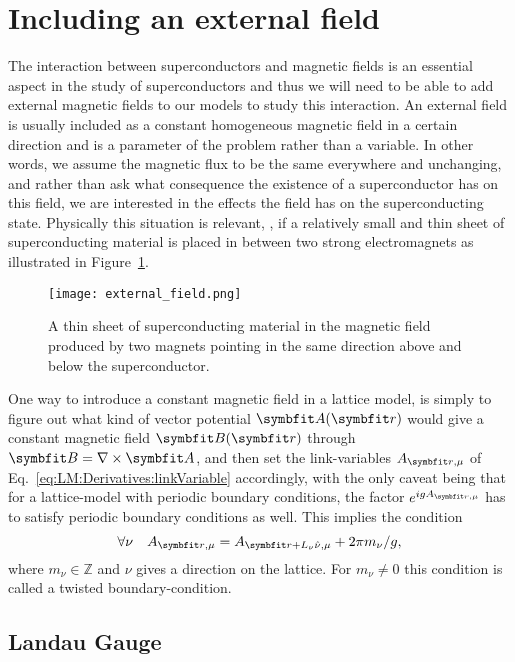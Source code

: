 \section{Including an external field}
\label{sec:LM:Field}

The interaction between superconductors and magnetic fields is an essential aspect in the study of superconductors and thus we will need to be able to add external magnetic fields
to our models to study this interaction. An external field is usually included as a constant homogeneous magnetic field in a certain direction and is a parameter of
the problem rather than a variable. In other words, we assume the magnetic flux to be the same everywhere and unchanging, and rather than ask what consequence the existence of a superconductor
has on this field, we are interested in the effects the field has on the superconducting state. Physically this situation is relevant, \eg, if a relatively small and thin sheet
of superconducting material is placed in between two strong electromagnets as illustrated in Figure~\ref{fig:LM:Field:externalField}.
\begin{figure}[t]
    \centering
    \texttt{[image: external\_field.png]}
    \caption{A thin sheet of superconducting material in the magnetic field produced by two magnets pointing in the same direction above and below the superconductor.}
    \label{fig:LM:Field:externalField}
\end{figure}

One way to introduce a constant magnetic field in a lattice model, is simply to figure out what kind of vector potential $\v{A}(\v{r})$ would give a constant magnetic field $\v{B}(\v{r})$
through $\v{B} = \nabla\times\v{A}$, and then set the link-variables $A_{\v{r},\mu}$ of Eq.~\eqref{eq:LM:Derivatives:linkVariable} accordingly, with the only caveat being that for
a lattice-model with periodic boundary conditions,
the factor $e^{igA_{\v{r},\mu}}$ has to satisfy periodic boundary conditions as well. This implies the condition
\begin{equation}
    \label{eq:LM:Field:periodicBC}
    \forall\nu\quad A_{\v{r},\mu} = A_{\v{r}+L_\nu\hat{\nu},\mu} + 2\pi m_\nu/g,
\end{equation}
where $m_\nu\in\mathbb{Z}$ and $\nu$ gives a direction on the lattice. For $m_\nu\neq0$ this condition is called a twisted boundary-condition.

\subsection{Landau Gauge}
\label{sec:LM:Field:LandauGauge}


